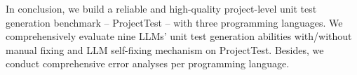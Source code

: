 In conclusion, we build a reliable and high-quality project-level unit test generation benchmark -- ProjectTest -- with three programming languages. We comprehensively evaluate nine LLMs' unit test generation abilities with/without manual fixing and LLM self-fixing mechanism on ProjectTest. Besides, we conduct comprehensive error analyses per programming language.